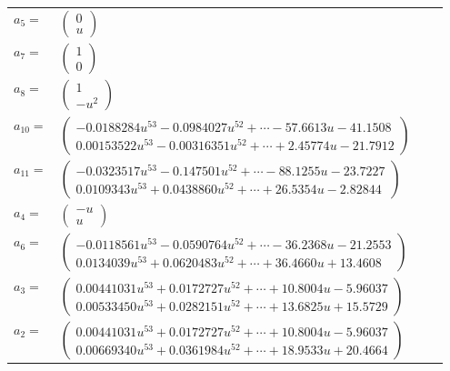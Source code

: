 \documentclass[1p]{elsarticle_modified}
\theoremstyle{definition}
\begin{document}
\begin{tabular}{m{7pt} m{180pt} m{7pt} m{180pt} }
\flushright $a_{5}=$&$\begin{pmatrix}0\\u\end{pmatrix}$ \\
\flushright $a_{7}=$&$\begin{pmatrix}1\\0\end{pmatrix}$ \\
\flushright $a_{8}=$&$\begin{pmatrix}1\\- u^2\end{pmatrix}$ \\
\flushright $a_{10}=$&$\begin{pmatrix}-0.0188284 u^{53}-0.0984027 u^{52}+\cdots-57.6613 u-41.1508\\0.00153522 u^{53}-0.00316351 u^{52}+\cdots+2.45774 u-21.7912\end{pmatrix}$ \\
\flushright $a_{11}=$&$\begin{pmatrix}-0.0323517 u^{53}-0.147501 u^{52}+\cdots-88.1255 u-23.7227\\0.0109343 u^{53}+0.0438860 u^{52}+\cdots+26.5354 u-2.82844\end{pmatrix}$ \\
\flushright $a_{4}=$&$\begin{pmatrix}- u\\u\end{pmatrix}$ \\
\flushright $a_{6}=$&$\begin{pmatrix}-0.0118561 u^{53}-0.0590764 u^{52}+\cdots-36.2368 u-21.2553\\0.0134039 u^{53}+0.0620483 u^{52}+\cdots+36.4660 u+13.4608\end{pmatrix}$ \\
\flushright $a_{3}=$&$\begin{pmatrix}0.00441031 u^{53}+0.0172727 u^{52}+\cdots+10.8004 u-5.96037\\0.00533450 u^{53}+0.0282151 u^{52}+\cdots+13.6825 u+15.5729\end{pmatrix}$ \\
\flushright $a_{2}=$&$\begin{pmatrix}0.00441031 u^{53}+0.0172727 u^{52}+\cdots+10.8004 u-5.96037\\0.00669340 u^{53}+0.0361984 u^{52}+\cdots+18.9533 u+20.4664\end{pmatrix}$ \\

\end{tabular}
\end{document}
